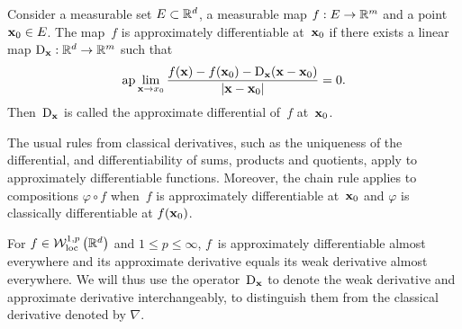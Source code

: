 \begin{definition}\label{def:approximatediff}
Consider a measurable set $E\subset \mathbb{R}^d$, a measurable map $f:E\rightarrow \mathbb{R}^m$ and a point $\boldsymbol{\mathrm{x}}_0\in E$. 
The map~$f$ is approximately differentiable at~$\boldsymbol{\mathrm{x}}_0$ if there exists a linear map $\mathrm{D}_{\boldsymbol{\mathrm{x}}}:\mathbb{R}^d\rightarrow\mathbb{R}^m$ such that
\[
\mathrm{ap}\lim_{\mathbf{x} \rightarrow x_{0}} \frac{f(\mathbf{x})-f(\boldsymbol{\mathrm{x}}_{0})-\mathrm{D}_{\boldsymbol{\mathrm{x}}}(\mathbf{x}-\boldsymbol{\mathrm{x}}_{0})}{|\mathbf{x}-\boldsymbol{\mathrm{x}}_{0}|}=0.
\]
Then~$\mathrm{D}_{\boldsymbol{\mathrm{x}}}$ is called the approximate differential of~$f$ at~$\boldsymbol{\mathrm{x}}_0$.
\end{definition}
\begin{remark}\label{rem:usualdiffrules}
The usual rules from classical derivatives, such as the uniqueness of the differential, and differentiability of sums, products and quotients, apply to approximately differentiable functions. 
Moreover, the chain rule applies to compositions $\varphi\circ f$ when~$f$ is approximately differentiable at~$\boldsymbol{\mathrm{x}}_0$ and $\varphi$ is classically differentiable at $f(\boldsymbol{\mathrm{x}}_0)$.
\end{remark}
\begin{remark}\label{rem:approxweakeq}
For $f\in \mathcal{W}_{\mathrm{loc}}^{1, p}\left(\mathbb{R}^{d}\right)$ and ${1 \leq p \leq \infty}$, $f$~is approximately differentiable almost everywhere and its approximate derivative equals its weak derivative almost everywhere. 
We will thus use the operator~$\mathrm{D}_{\boldsymbol{\mathrm{x}}}$ to denote the weak derivative and approximate derivative interchangeably, to distinguish them from the classical derivative denoted by $\nabla$.
\end{remark}

